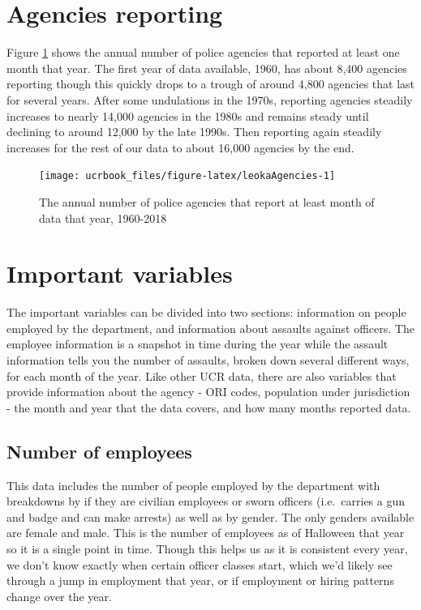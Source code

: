 \documentclass[
  12pt,
  openany]{book}
\begin{document}
\hypertarget{agencies-reporting-4}{%
\section{Agencies reporting}\label{agencies-reporting-4}}

Figure \ref{fig:leokaAgencies} shows the annual number of police agencies that reported at least one month that year. The first year of data available, 1960, has about 8,400 agencies reporting though this quickly drops to a trough of around 4,800 agencies that last for several years. After some undulations in the 1970s, reporting agencies steadily increases to nearly 14,000 agencies in the 1980s and remains steady until declining to around 12,000 by the late 1990s. Then reporting again steadily increases for the rest of our data to about 16,000 agencies by the end.

\begin{figure}

{\centering \texttt{[image: ucrbook\_files/figure-latex/leokaAgencies-1]} 

}

\caption{The annual number of police agencies that report at least month of data that year, 1960-2018}\label{fig:leokaAgencies}
\end{figure}

\hypertarget{important-variables-4}{%
\section{Important variables}\label{important-variables-4}}

The important variables can be divided into two sections: information on people employed by the department, and information about assaults against officers. The employee information is a snapshot in time during the year while the assault information tells you the number of assaults, broken down several different ways, for each month of the year. Like other UCR data, there are also variables that provide information about the agency - ORI codes, population under jurisdiction - the month and year that the data covers, and how many months reported data.

\hypertarget{number-of-employees}{%
\subsection{Number of employees}\label{number-of-employees}}

This data includes the number of people employed by the department with breakdowns by if they are civilian employees or sworn officers (i.e.~carries a gun and badge and can make arrests) as well as by gender. The only genders available are female and male. This is the number of employees as of Halloween that year so it is a single point in time. Though this helps us as it is consistent every year, we don't know exactly when certain officer classes start, which we'd likely see through a jump in employment that year, or if employment or hiring patterns change over the year.
\end{document}
